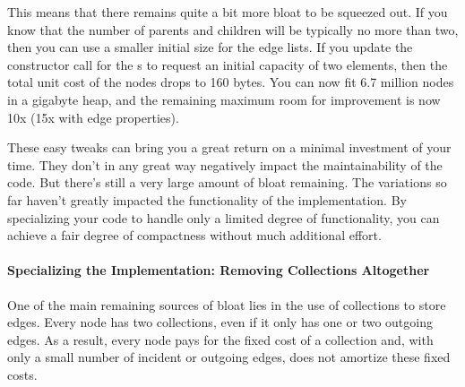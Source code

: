 This means that there remains quite a bit more bloat to be squeezed out. If you
know that the number of parents and children will be typically no more than two,
then you can use a smaller initial size for the edge lists. If you update the
constructor call for the s to request an initial capacity of
two elements, then the total unit cost of the nodes drops to 160 bytes. You can
now fit 6.7 million nodes in a gigabyte heap, and the remaining maximum room for
improvement is now 10x (15x with edge properties).



These easy tweaks can bring you a great return on a minimal investment of your
time. They don't in any great way negatively impact the maintainability of the
code. But there's still a very large amount of bloat remaining. The variations
so far haven't greatly impacted the functionality of the implementation. By
specializing your code to handle only a limited degree of functionality, you can
achieve a fair degree of compactness without much additional effort.

\paragraph{Specializing the Implementation: Removing Collections Altogether}
One of the main remaining sources of bloat lies in the use of collections to
store edges. Every node has two collections, even if it only has one or two
outgoing edges. As a result, every node pays for the fixed cost of a collection
and, with only a small number of incident or outgoing edges, does not amortize
these fixed costs.

